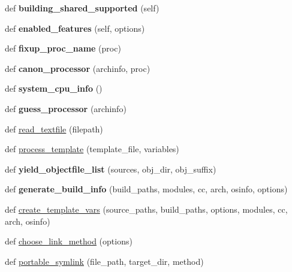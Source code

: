 \begin{DoxyCompactItemize}
def {\bfseries building\+\_\+shared\+\_\+supported} (self)
\item 
\mbox{\label{namespaceconfigure_aa2a514a46aaafbcc832eccf7129fab85}} 
def {\bfseries enabled\+\_\+features} (self, options)
\item 
\mbox{\label{namespaceconfigure_a78d6b08685ca001871ab0e551d489f69}} 
def {\bfseries fixup\+\_\+proc\+\_\+name} (proc)
\item 
\mbox{\label{namespaceconfigure_a4150ab24d8bef866d747b618cdec32d7}} 
def {\bfseries canon\+\_\+processor} (archinfo, proc)
\item 
\mbox{\label{namespaceconfigure_a5c9aa2dbb5d8cf16e8ed2dbcae3edba6}} 
def {\bfseries system\+\_\+cpu\+\_\+info} ()
\item 
\mbox{\label{namespaceconfigure_a4c64936972b46cb326ffa1aaab277248}} 
def {\bfseries guess\+\_\+processor} (archinfo)
\item 
def \mbox{\hyperlink{namespaceconfigure_a759d51888d7834a21084790c8e819889}{read\+\_\+textfile}} (filepath)
\item 
def \mbox{\hyperlink{namespaceconfigure_a0131813b774dd002d783ca87f2f4f5ce}{process\+\_\+template}} (template\+\_\+file, variables)
\item 
\mbox{\label{namespaceconfigure_afa2567e42b595175e50ecb7d3d2cc2e8}} 
def {\bfseries yield\+\_\+objectfile\+\_\+list} (sources, obj\+\_\+dir, obj\+\_\+suffix)
\item 
\mbox{\label{namespaceconfigure_a6b7902e698a9c7e49cb993a9dfbca862}} 
def {\bfseries generate\+\_\+build\+\_\+info} (build\+\_\+paths, modules, cc, arch, osinfo, options)
\item 
def \mbox{\hyperlink{namespaceconfigure_a5cddf00194b4c5daec9d4fd96c4d1fc7}{create\+\_\+template\+\_\+vars}} (source\+\_\+paths, build\+\_\+paths, options, modules, cc, arch, osinfo)
\item 
def \mbox{\hyperlink{namespaceconfigure_a5d2c022a14a541e23a9285c69e470d3e}{choose\+\_\+link\+\_\+method}} (options)
\item 
def \mbox{\hyperlink{namespaceconfigure_a6deca04e253af95f62125b9c30066345}{portable\+\_\+symlink}} (file\+\_\+path, target\+\_\+dir, method)

\end{DoxyCompactItemize}
